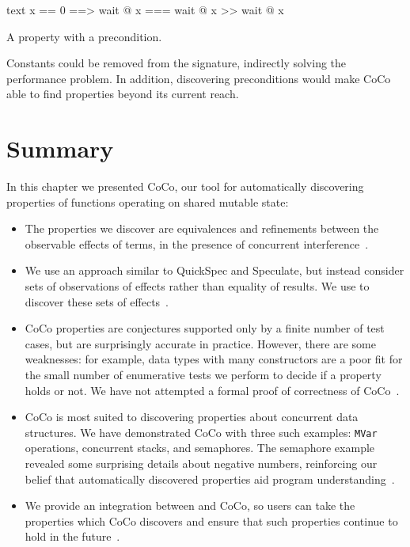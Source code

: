 \begin{listing}
\centering
\begin{cminted}{text}
x == 0  ==>  wait @ x  ===  wait @ x >> wait @ x
\end{cminted}
\caption{A property with a precondition.}\label{lst:precondition}
\end{listing}

Constants could be removed from the signature, indirectly solving the
performance problem.  In addition, discovering preconditions would
make CoCo able to find properties beyond its current
reach\cite{braquehais2017}.

\vfill\pagebreak
\section{Summary}

In this chapter we presented CoCo, our tool for automatically
discovering properties of functions operating on shared mutable state:

\begin{itemize}
\item The properties we discover are equivalences and refinements
  between the observable effects of terms, in the presence of
  concurrent interference~.

\item We use an approach similar to QuickSpec\cite{smallbone2017} and
  Speculate\cite{braquehais2017}, but instead consider sets of
  observations of effects rather than equality of results.  We use
  \dejafu{} to discover these sets of effects~.

\item CoCo properties are conjectures supported only by a finite
  number of test cases, but are surprisingly accurate in practice.
  However, there are some weaknesses: for example, data types with
  many constructors are a poor fit for the small number of enumerative
  tests we perform to decide if a property holds or not.  We have not
  attempted a formal proof of correctness of
  CoCo~.

\item CoCo is most suited to discovering properties about concurrent
  data structures.  We have demonstrated CoCo with three such
  examples: \verb|MVar| operations, concurrent stacks, and semaphores.
  The semaphore example revealed some surprising details about
  negative numbers, reinforcing our belief that automatically
  discovered properties aid program understanding~.

\item We provide an integration between \dejafu{} and CoCo, so users
  can take the properties which CoCo discovers and ensure that such
  properties continue to hold in the future~.
\end{itemize}

